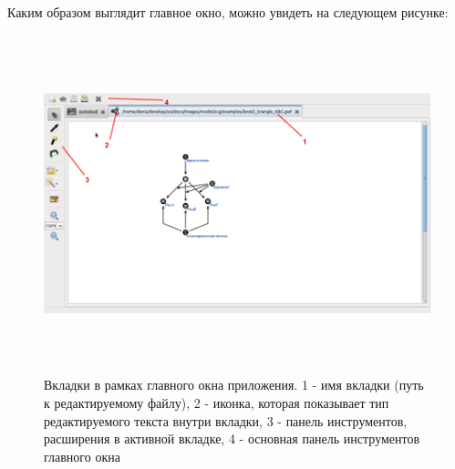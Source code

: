 Каким образом выглядит главное окно, можно увидеть на следующем рисунке:
\begin{figure}[h]
	\includegraphics[width=16.23cm, height=9.82cm]{../images/tabs.png}
	\caption{Вкладки в рамках главного окна приложения. 1 - имя вкладки (путь к редактируемому файлу), 2 - иконка, которая показывает
	тип редактируемого текста внутри вкладки, 3 - панель инструментов, расширения в активной вкладке, 4 - основная панель инструментов главного окна}
	\label{pic_tabs}
\end{figure}
